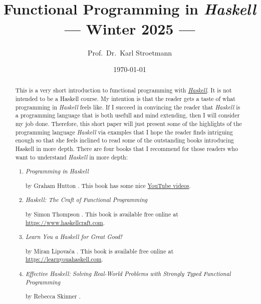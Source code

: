 \documentclass[11pt]{report}
\title{\epsfig{file=dhbw-logo.pdf, scale=1.5}\\[0.3cm]  
       Functional Programming in \textsl{Haskell} \\[0.3cm]
      --- Winter 2025 ---}
\author{Prof.~Dr.~Karl Stroetmann}
\date{\today \\[1.5cm]
  \dangersign \wip \dangersign
}
\begin{document}
\maketitle
\tableofcontents

\begin{abstract}
\noindent
This is a very short introduction to functional programming with
\href{https://en.wikipedia.org/wiki/Haskell}{\textsl{Haskell}}. 
It is not intended to be a Haskell course.  My intention is that the reader gets a taste of what
programming in \textsl{Haskell} feels like.  If I succeed in convincing the reader that \textsl{Haskell} is a
programming language that is both usefull and mind extending, then I will consider my job done.
Therefore, this short paper will just present some of the highlights of the programming language
\textsl{Haskell} via examples that I hope the reader finds intriguing enough so that she feels inclined to read
some of the outstanding books introducing Haskell in more depth.  There are four books that I recommend for
those readers who want to understand \textsl{Haskell} in more depth:  
\begin{enumerate}
\item \emph{Programming in Haskell}

      by Graham Hutton \cite{hutton:2016}.  This book has some nice \href{https://www.youtube.com/playlist?list=PLF1Z-APd9zK7usPMx3LGMZEHrECUGodd3}{YouTube videos}.
\item \emph{Haskell: The Craft of Functional Programming}

      by Simon Thompson \cite{thompson:2011}.
      This book is available free online at
      \\[0.2cm]
      \hspace*{1.3cm}
      \href{https://www.haskellcraft.com}{https://www.haskellcraft.com}.

\item \emph{Learn You a Haskell for Great Good!}

      by Miran Lipova\v{c}a \cite{lipovaca:2011}.
      This book is available free online at
      \\[0.2cm]
      \hspace*{1.3cm}
      \href{https://learnyouahaskell.com/}{https://learnyouahaskell.com}.
\item \emph{Effective Haskell: Solving Real-World Problems with Strongly Typed Functional Programming} 

      by Rebecca Skinner \cite{skinner:2023}.
\end{enumerate}
\end{abstract}







\end{document}
